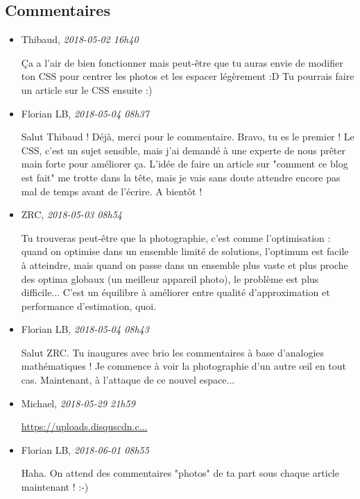 \documentclass[]{article}
\date{}
\begin{document}
\hypertarget{commentaires}{%
\subsection{Commentaires}\label{commentaires}}

\begin{itemize}
\item
  Thibaud, \emph{2018-05-02 16h40}

  Ça a l'air de bien fonctionner mais peut-être que tu auras envie de
  modifier ton CSS pour centrer les photos et les espacer légèrement :D
  Tu pourrais faire un article sur le CSS ensuite :)
\item
  Florian LB, \emph{2018-05-04 08h37}

  Salut Thibaud ! Déjà, merci pour le commentaire. Bravo, tu es le
  premier ! Le CSS, c'est un sujet sensible, mais j'ai demandé à une
  experte de nous prêter main forte pour améliorer ça. L'idée de faire
  un article sur "comment ce blog est fait" me trotte dans la tête, mais
  je vais sans doute attendre encore pas mal de temps avant de l'écrire.
  A bientôt !
\item
  ZRC, \emph{2018-05-03 08h54}

  Tu trouveras peut-être que la photographie, c'est comme l'optimisation
  : quand on optimise dans un ensemble limité de solutions, l'optimum
  est facile à atteindre, mais quand on passe dans un ensemble plus
  vaste et plus proche des optima globaux (un meilleur appareil photo),
  le problème est plus difficile... C'est un équilibre à améliorer entre
  qualité d'approximation et performance d'estimation, quoi.
\item
  Florian LB, \emph{2018-05-04 08h43}

  Salut ZRC. Tu inaugures avec brio les commentaires à base d'analogies
  mathématiques ! Je commence à voir la photographie d'un autre œil en
  tout cas. Maintenant, à l'attaque de ce nouvel espace...
\item
  Michael, \emph{2018-05-29 21h59}

  \href{https://uploads.disquscdn.com/images/d3d52c79db3c778c55746cf8982dd515cea75ba04db4e5912de5a2f20df6195c.png}{https://uploads.disquscdn.c...}
\item
  Florian LB, \emph{2018-06-01 08h55}

  Haha. On attend des commentaires "photos" de ta part sous chaque
  article maintenant ! :-)
\end{itemize}
\end{document}
